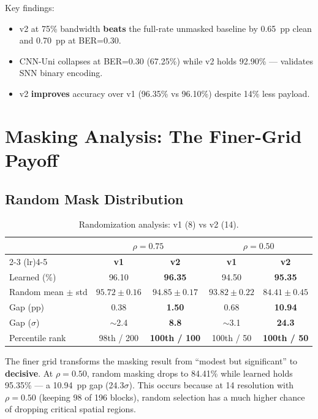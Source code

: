 \documentclass[conference]{IEEEtran}
\begin{document}
Key findings:
\begin{itemize}
    \item v2 at 75\% bandwidth \textbf{beats} the full-rate unmasked baseline by 0.65~pp clean and 0.70~pp at BER=0.30.
    \item CNN-Uni collapses at BER=0.30 (67.25\%) while v2 holds 92.90\% — validates SNN binary encoding.
    \item v2 \textbf{improves} accuracy over v1 (96.35\% vs 96.10\%) despite 14\% less payload.
\end{itemize}


\section{Masking Analysis: The Finer-Grid Payoff}

\subsection{Random Mask Distribution}

\begin{table}[h]
\centering
\caption{Randomization analysis: v1 (8) vs v2 (14).}
\begin{tabular}{@{}l c c c c@{}}
\toprule
& \multicolumn{2}{c}{$\rho = 0.75$} & \multicolumn{2}{c}{$\rho = 0.50$} \\
\cmidrule(lr){2-3} \cmidrule(lr){4-5}
& \textbf{v1} & \textbf{v2} & \textbf{v1} & \textbf{v2} \\
\midrule
Learned (\%) & 96.10 & \textbf{96.35} & 94.50 & \textbf{95.35} \\
Random mean $\pm$ std & $95.72 \pm 0.16$ & $94.85 \pm 0.17$ & $93.82 \pm 0.22$ & $84.41 \pm 0.45$ \\
Gap (pp) & 0.38 & \textbf{1.50} & 0.68 & \textbf{10.94} \\
Gap ($\sigma$) & $\sim$2.4 & \textbf{8.8} & $\sim$3.1 & \textbf{24.3} \\
Percentile rank & 98th / 200 & \textbf{100th / 100} & 100th / 50 & \textbf{100th / 50} \\
\bottomrule
\end{tabular}
\end{table}

The finer grid transforms the masking result from ``modest but significant'' to \textbf{decisive}. At $\rho{=}0.50$, random masking drops to 84.41\% while learned holds 95.35\% --- a 10.94~pp gap (24.3$\sigma$). This occurs because at 14 resolution with $\rho{=}0.50$ (keeping 98 of 196 blocks), random selection has a much higher chance of dropping critical spatial regions.
\end{document}
